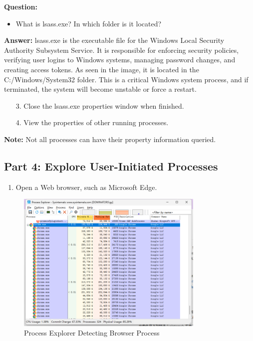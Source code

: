 \documentclass[12pt,a4paper]{article}
\begin{document}
\textbf{Question:}
\begin{itemize}
    \item What is lsass.exe? In which folder is it located?
\end{itemize}

\textbf{Answer:}
lsass.exe is the executable file for the Windows Local Security Authority Subsystem Service. It is responsible for enforcing security policies, verifying user logins to Windows systems, managing password changes, and creating access tokens. As seen in the image, it is located in the C:/Windows/System32 folder. This is a critical Windows system process, and if terminated, the system will become unstable or force a restart.

\begin{enumerate}
    \item[3.] Close the lsass.exe properties window when finished.
    \item[4.] View the properties of other running processes.
\end{enumerate}

\textbf{Note:} Not all processes can have their property information queried.

\subsection{Part 4: Explore User-Initiated Processes}

\begin{enumerate}
    \item Open a Web browser, such as Microsoft Edge.
\end{enumerate}

\begin{figure}[H]
    \centering
    \includegraphics[width=0.8\textwidth]{proecxp.png}
    \caption{Process Explorer Detecting Browser Process}
    \label{fig:procexp}
\end{figure}
\end{document}
